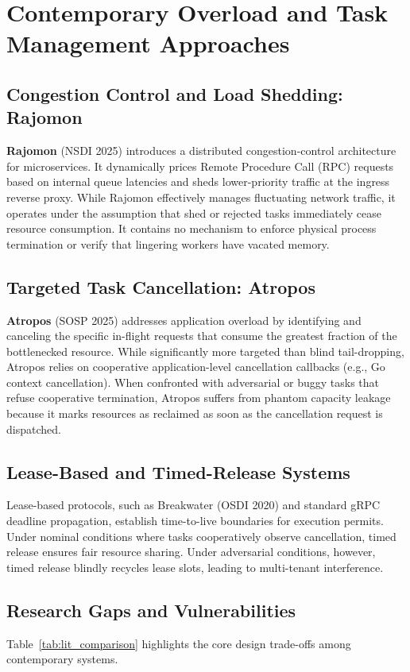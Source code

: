 \documentclass[12pt,a4paper]{report}
\begin{document}
\section{Contemporary Overload and Task Management Approaches}

\subsection{Congestion Control and Load Shedding: Rajomon}
\textbf{Rajomon} (NSDI 2025) introduces a distributed congestion-control architecture for microservices. It dynamically prices Remote Procedure Call (RPC) requests based on internal queue latencies and sheds lower-priority traffic at the ingress reverse proxy. While Rajomon effectively manages fluctuating network traffic, it operates under the assumption that shed or rejected tasks immediately cease resource consumption. It contains no mechanism to enforce physical process termination or verify that lingering workers have vacated memory.

\subsection{Targeted Task Cancellation: Atropos}
\textbf{Atropos} (SOSP 2025) addresses application overload by identifying and canceling the specific in-flight requests that consume the greatest fraction of the bottlenecked resource. While significantly more targeted than blind tail-dropping, Atropos relies on cooperative application-level cancellation callbacks (e.g., Go context cancellation). When confronted with adversarial or buggy tasks that refuse cooperative termination, Atropos suffers from phantom capacity leakage because it marks resources as reclaimed as soon as the cancellation request is dispatched.

\subsection{Lease-Based and Timed-Release Systems}
Lease-based protocols, such as Breakwater (OSDI 2020) and standard gRPC deadline propagation, establish time-to-live boundaries for execution permits. Under nominal conditions where tasks cooperatively observe cancellation, timed release ensures fair resource sharing. Under adversarial conditions, however, timed release blindly recycles lease slots, leading to multi-tenant interference.

\subsection{Research Gaps and Vulnerabilities}
Table~\ref{tab:lit_comparison} highlights the core design trade-offs among contemporary systems. 
\end{document}
